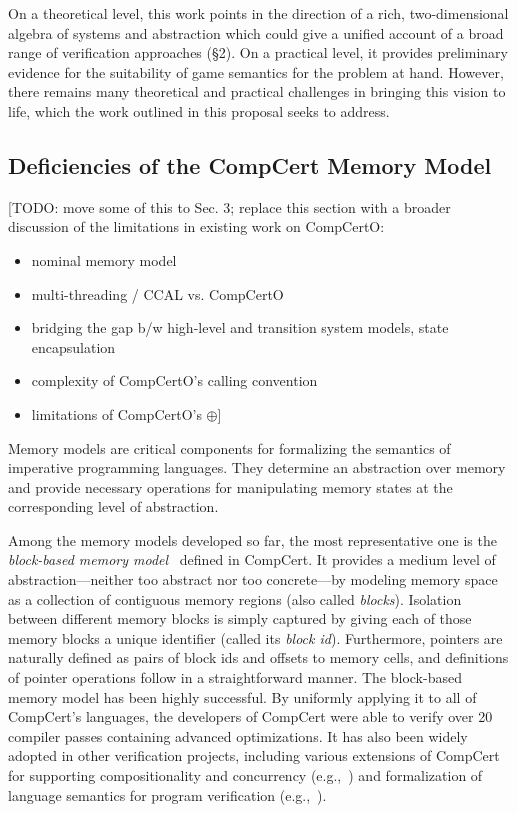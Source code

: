 On a theoretical level,
this work points in the direction of a rich, two-dimensional algebra 
of systems and abstraction
which could give a unified account
of a broad range of verification approaches (\S2).
On a practical level,
it provides preliminary evidence
for the suitability of game semantics for the problem at hand.
However,
there remains many theoretical and practical challenges
in bringing this vision to life,
which the work outlined in this proposal seeks to address.

\subsection{Deficiencies of the CompCert Memory Model}
\label{ssec:intro-nmm}

[TODO: move some of this to Sec. 3;
replace this section with a broader discussion of
the limitations in existing work on CompCertO:
\begin{itemize}
  \item nominal memory model
  \item multi-threading / CCAL vs. CompCertO
  \item bridging the gap b/w high-level and transition system models,
    state encapsulation
  \item complexity of CompCertO's calling convention
  \item limitations of CompCertO's $\oplus$]
\end{itemize}

Memory models are critical components for formalizing the semantics of
imperative programming languages. They determine an abstraction over
memory and provide necessary operations for manipulating memory states
at the corresponding level of abstraction.

Among the memory models developed so far, the most representative one
is the \emph{block-based memory model}~\cite{leroy08,compcert-mem-v2}
defined in CompCert.  It provides a medium level of
abstraction---neither too abstract nor too concrete---by modeling
memory space as a collection of contiguous memory regions (also called
\emph{blocks}). Isolation between different memory blocks is simply
captured by giving each of those memory blocks a unique identifier
(called its \emph{block id}). Furthermore, pointers are naturally
defined as pairs of block ids and offsets to memory cells, and
definitions of pointer operations follow in a straightforward manner.
The block-based memory model has been highly successful. By uniformly
applying it to all of CompCert's languages, the developers of CompCert
were able to verify over 20 compiler passes containing advanced
optimizations.  It has also been widely adopted in other verification
projects, including various extensions of CompCert for supporting
compositionality and concurrency
(e.g.,~\cite{sevcik13,compcompcert,compcertm,cascompcert,wang2019,compcertelf20,sepcompcert,compcerts})
and formalization of language semantics for program verification
(e.g.,~\cite{appel11:vst,dscal15,ccal18}).

